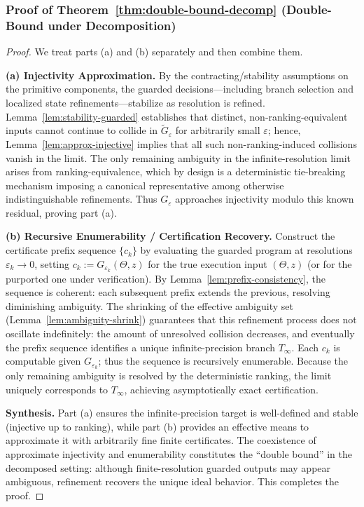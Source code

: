 \documentclass[12pt]{article}
\theoremstyle{definition}
\theoremstyle{plain}
\begin{document}
\subsubsection*{Proof of Theorem~\ref{thm:double-bound-decomp} (Double-Bound under Decomposition)}
\label{proof:double-bound-decomp}

\begin{proof}
We treat parts (a) and (b) separately and then combine them.

\textbf{(a) Injectivity Approximation.}  
By the contracting/stability assumptions on the primitive components, the guarded decisions—including branch selection and localized state refinements—stabilize as resolution is refined. Lemma~\ref{lem:stability-guarded} establishes that distinct, non-ranking-equivalent inputs cannot continue to collide in \(\tilde G_\varepsilon\) for arbitrarily small \(\varepsilon\); hence, Lemma~\ref{lem:approx-injective} implies that all such non-ranking-induced collisions vanish in the limit. The only remaining ambiguity in the infinite-resolution limit arises from ranking-equivalence, which by design is a deterministic tie-breaking mechanism imposing a canonical representative among otherwise indistinguishable refinements. Thus \(G_\varepsilon\) approaches injectivity modulo this known residual, proving part (a).

\textbf{(b) Recursive Enumerability / Certification Recovery.}  
Construct the certificate prefix sequence \(\{c_k\}\) by evaluating the guarded program at resolutions \(\varepsilon_k\to0\), setting \(c_k := G_{\varepsilon_k}(\Theta,z)\) for the true execution input \((\Theta,z)\) (or for the purported one under verification). By Lemma~\ref{lem:prefix-consistency}, the sequence is coherent: each subsequent prefix extends the previous, resolving diminishing ambiguity. The shrinking of the effective ambiguity set (Lemma~\ref{lem:ambiguity-shrink}) guarantees that this refinement process does not oscillate indefinitely: the amount of unresolved collision decreases, and eventually the prefix sequence identifies a unique infinite-precision branch \(T_\infty\). Each \(c_k\) is computable given \(G_{\varepsilon_k}\); thus the sequence is recursively enumerable. Because the only remaining ambiguity is resolved by the deterministic ranking, the limit uniquely corresponds to \(T_\infty\), achieving asymptotically exact certification.

\textbf{Synthesis.}  
Part (a) ensures the infinite-precision target is well-defined and stable (injective up to ranking), while part (b) provides an effective means to approximate it with arbitrarily fine finite certificates. The coexistence of approximate injectivity and enumerability constitutes the “double bound” in the decomposed setting: although finite-resolution guarded outputs may appear ambiguous, refinement recovers the unique ideal behavior. This completes the proof.
\end{proof}
\end{document}

